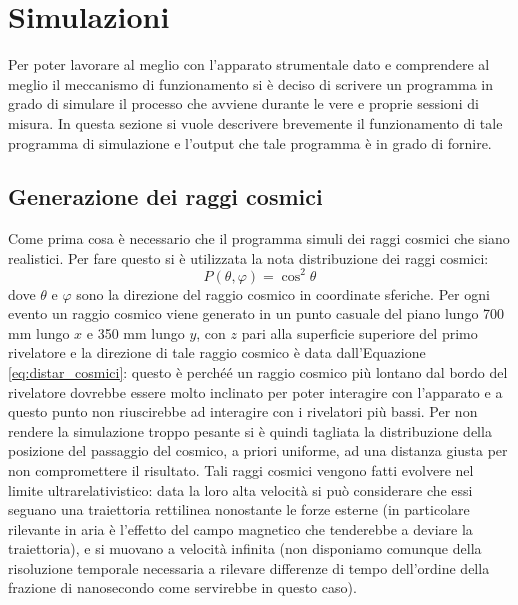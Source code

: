 \section{Simulazioni}
Per poter lavorare al meglio con l'apparato strumentale dato e comprendere al meglio il meccanismo di funzionamento si è deciso di scrivere un programma in grado di simulare
il processo che avviene durante le vere e proprie sessioni di misura. In questa sezione si vuole descrivere brevemente il funzionamento di tale programma di simulazione e
l'output che tale programma è in grado di fornire.
\subsection{Generazione dei raggi cosmici}
Come prima cosa è necessario che il programma simuli dei raggi cosmici che siano realistici. Per fare questo si è utilizzata la nota distribuzione dei raggi cosmici:
\begin{equation}
	P\left(\theta, \varphi\right) = \cos^2{\theta}
	\label{eq:distr_cosmici}
\end{equation}
dove $\theta$ e $\varphi$ sono la direzione del raggio cosmico in coordinate sferiche.
Per ogni evento un raggio cosmico viene generato in un punto casuale del piano lungo 700 mm lungo $x$ e 350 mm lungo $y$, con $z$ pari alla superficie superiore del primo rivelatore e la direzione di tale raggio cosmico è data dall'Equazione \ref{eq:distar_cosmici}: questo \`e perché\'e un raggio cosmico pi\`u lontano dal bordo del rivelatore dovrebbe essere molto inclinato per poter interagire con l'apparato e a questo punto non riuscirebbe ad interagire con i rivelatori pi\`u bassi. Per non rendere la simulazione troppo pesante si \`e quindi tagliata la distribuzione della posizione del passaggio del cosmico, a priori uniforme, ad una distanza giusta per non compromettere il risultato.
Tali raggi cosmici vengono fatti evolvere nel limite ultrarelativistico: data la loro alta velocità si può considerare che essi seguano una traiettoria rettilinea nonostante
le forze esterne (in particolare rilevante in aria è l'effetto del campo magnetico che tenderebbe a deviare la traiettoria), e si muovano a velocità infinita (non disponiamo comunque della risoluzione temporale necessaria a rilevare differenze di tempo dell'ordine della frazione di nanosecondo come servirebbe in questo caso).


